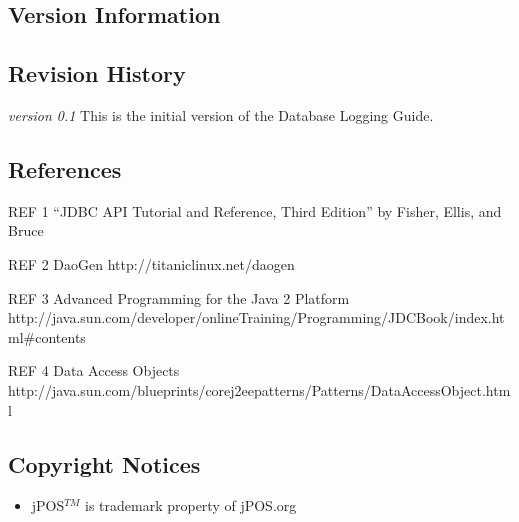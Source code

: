 \documentclass[11pt]{report}
\begin{document}
\begin{flushleft}
\chapter{Version Information}
    \section{Revision History}
        \begin{list}{}
        {\setlength{\labelwidth}{2cm}\setlength{\leftmargin}{2.6cm}
        \setlength{\labelsep}{0.5cm}\setlength{\rightmargin}{1cm}
        \setlength{\parsep}{0.5ex plus0.2ex minus0.1ex}
        \setlength{\itemsep}{0ex plus0.2ex}}

        \item[\slshape{version 0.1}] This is the initial version of the
        Database Logging Guide.

        \end{list}

    \section{References}
        \begin{list}{}
        {\setlength{\labelwidth}{2cm}\setlength{\leftmargin}{2.6cm}
        \setlength{\labelsep}{0.5cm}\setlength{\rightmargin}{1cm}
        \setlength{\parsep}{0.5ex plus0.2ex minus0.1ex}
        \setlength{\itemsep}{0ex plus0.2ex}}
        
        \item[REF 1] ``JDBC API Tutorial and Reference, Third Edition'' 
        by Fisher, Ellis, and Bruce

        \item[REF 2] DaoGen http://titaniclinux.net/daogen

        \item[REF 3] Advanced Programming for the Java 2 Platform
        http://java.sun.com/developer/onlineTraining/Programming/JDCBook/index.html\#contents

        \item[REF 4] Data Access Objects
        http://java.sun.com/blueprints/corej2eepatterns/Patterns/DataAccessObject.html

        \end{list}
        
    \section{Copyright Notices}
        \begin{itemize}
        \item jPOS$^{TM}$ is trademark property of jPOS.org
        \end{itemize}


\end{flushleft}
\end{document}
